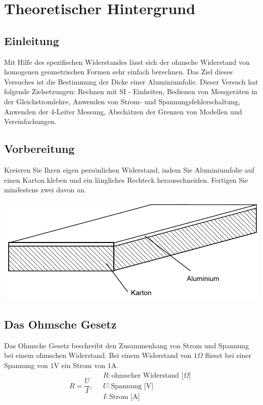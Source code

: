 \section{Theoretischer Hintergrund}
\subsection{Einleitung}
Mit Hilfe des spezifischen Widerstandes lässt sich der ohmsche Widerstand von homogenen geometrischen Formen sehr einfach berechnen. Das Ziel dieses Versuches ist die Bestimmung der Dicke einer Aluminiumfolie.
Dieser Versuch hat folgende Zielsetzungen: Rechnen mit SI - Einheiten, Bedienen von Messgeräten in der Gleichstromlehre, Anwenden von Strom- und Spannungsfehlerschaltung, Anwenden der 4-Leiter Messung, Abschätzen der Grenzen von Modellen und Vereinfachungen.
\subsection{Vorbereitung}
Kreieren Sie Ihren eigen persönlichen Widerstand, indem Sie Aluminiumfolie auf einen Karton kleben und ein längliches Rechteck herausschneiden. Fertigen Sie mindestens zwei davon an.
\begin{center}
\includegraphics[scale=0.5]{../img/II/IIa}
\end{center}
\subsection{Das Ohmsche Gesetz}
Das Ohmsche Gesetz beschreibt den Zusammenhang von Strom und Spannung bei einem ohmschen Widerstand. Bei einem Widerstand von $1\Omega$ fliesst bei einer Spannung von $1\text{V}$ ein Strom von $1\text{A}$.
\begin{equation}
\boxed{R=\dfrac{U}{I},\quad \begin{array}{l}R:\text{ohmscher Widerstand} \text{ [}\Omega\text{]}\\U:\text{Spannung} \text{ [V]}\\I:\text{Strom}\text{ [A]}\end{array}}
\end{equation}
